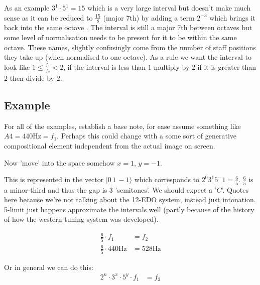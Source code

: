 \documentclass[10pt,a4paper]{article}
\begin{document}
As an example $3^1 \cdot 5^1 = 15$ which is a very large interval but doesn't make much sense as it
can be reduced to $\frac{15}{8}$ (major 7th) by adding a term $2^{-3}$ which brings it back into the
same octave . The interval is still a major 7th between octaves but some level of normalisation
needs to be present for it to be within the same octave. These names, slightly confusingly come from
the number of staff positions they take up (when normalised to one octave). As a rule we want the
interval to look like $1 \leq \frac{f_1}{f_2} < 2$, if the interval is less than $1$ multiply by $2$
if it is greater than $2$ then divide by $2$.

\subsection{Example}
For all of the examples, establish a base note, for ease assume something like $A4 = 440\si{\hertz}
= f_1$. Perhaps this could change with a some sort of generative compositional element independent
from the actual image on screen.

Now 'move' into the space somehow $x=1$, $y=-1$.

\begin{center}
\end{center}

This is represented in the vector $|0\, 1\, -1\rangle$ which corresponds to $2^0 3^1 5^-1 =
\frac{6}{5}$. $\frac{6}{5}$ is a minor-third and thus the gap is 3 'semitones'. We should expect a
'$C$'. Quotes here because we're not talking about the 12-EDO system, instead just intonation.
5-limit just happens approximate the intervals well (partly because of the history of how the
western tuning system was developed).

\begin{align*}
    \frac{6}{5} \cdot f_1 &= f_2\\
    \frac{6}{5} \cdot 440\si{\hertz} &= 528\si{\hertz}
\end{align*}

Or in general we can do this:
\begin{align*}
    2^n \cdot 3^x \cdot 5^y \cdot f_1 &= f_2\\
\end{align*}
\end{document}
